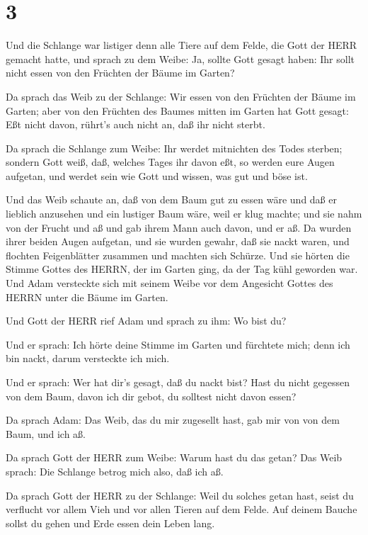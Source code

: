 \hypertarget{section-2}{%
\section{3}\label{section-2}}

 Und die Schlange war listiger denn alle Tiere auf dem
Felde, die Gott der HERR gemacht hatte, und sprach zu dem Weibe: Ja,
sollte Gott gesagt haben: Ihr sollt nicht essen von den Früchten der
Bäume im Garten?

 Da sprach das Weib zu der Schlange: Wir essen von den
Früchten der Bäume im Garten;  aber von den Früchten des
Baumes mitten im Garten hat Gott gesagt: Eßt nicht davon, rührt's auch
nicht an, daß ihr nicht sterbt.

 Da sprach die Schlange zum Weibe: Ihr werdet mitnichten des
Todes sterben;  sondern Gott weiß, daß, welches Tages ihr
davon eßt, so werden eure Augen aufgetan, und werdet sein wie Gott und
wissen, was gut und böse ist.

 Und das Weib schaute an, daß von dem Baum gut zu essen wäre
und daß er lieblich anzusehen und ein lustiger Baum wäre, weil er klug
machte; und sie nahm von der Frucht und aß und gab ihrem Mann auch
davon, und er aß.  Da wurden ihrer beiden Augen aufgetan,
und sie wurden gewahr, daß sie nackt waren, und flochten Feigenblätter
zusammen und machten sich Schürze.  Und sie hörten die
Stimme Gottes des HERRN, der im Garten ging, da der Tag kühl geworden
war. Und Adam versteckte sich mit seinem Weibe vor dem Angesicht Gottes
des HERRN unter die Bäume im Garten.

 Und Gott der HERR rief Adam und sprach zu ihm: Wo bist du?

 Und er sprach: Ich hörte deine Stimme im Garten und
fürchtete mich; denn ich bin nackt, darum versteckte ich mich.

 Und er sprach: Wer hat dir's gesagt, daß du nackt bist?
Hast du nicht gegessen von dem Baum, davon ich dir gebot, du solltest
nicht davon essen?

 Da sprach Adam: Das Weib, das du mir zugesellt hast, gab
mir von von dem Baum, und ich aß.

 Da sprach Gott der HERR zum Weibe: Warum hast du das
getan? Das Weib sprach: Die Schlange betrog mich also, daß ich aß.

 Da sprach Gott der HERR zu der Schlange: Weil du solches
getan hast, seist du verflucht vor allem Vieh und vor allen Tieren auf
dem Felde. Auf deinem Bauche sollst du gehen und Erde essen dein Leben
lang.

